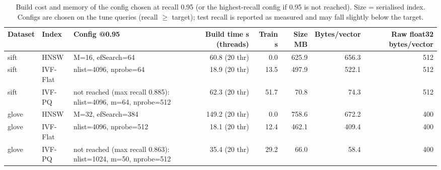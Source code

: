 \begin{table}[t]
\centering
\small
\begin{adjustbox}{max width=\linewidth}
\begin{tabular}{llp{4.2cm}rrrrr}
\toprule
Dataset & Index & Config @0.95 & Build time s (threads) & Train s & Size MB & Bytes/vector & Raw float32 bytes/vector \\
\midrule
sift & HNSW & M=16, efSearch=64 & 60.8 (20 thr) & 0.0 & 625.9 & 656.3 & 512 \\
sift & IVF-Flat & nlist=4096, nprobe=64 & 18.9 (20 thr) & 13.5 & 497.9 & 522.1 & 512 \\
sift & IVF-PQ & not reached (max recall 0.885): nlist=4096, m=64, nprobe=512 & 62.3 (20 thr) & 51.7 & 70.8 & 74.3 & 512 \\
glove & HNSW & M=32, efSearch=384 & 149.2 (20 thr) & 0.0 & 758.6 & 672.2 & 400 \\
glove & IVF-Flat & nlist=4096, nprobe=512 & 18.1 (20 thr) & 12.4 & 462.1 & 409.4 & 400 \\
glove & IVF-PQ & not reached (max recall 0.863): nlist=1024, m=50, nprobe=512 & 35.4 (20 thr) & 29.2 & 66.0 & 58.4 & 400 \\
\bottomrule
\end{tabular}
\end{adjustbox}
\caption{Build cost and memory of the config chosen at recall 0.95 (or the highest-recall config if 0.95 is not reached). Size = serialised index. Configs are chosen on the tune queries (recall $\geq$ target); test recall is reported as measured and may fall slightly below the target.}
\label{tab:part2_cost}
\end{table}
